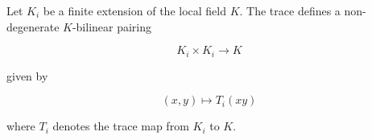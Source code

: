 Let $K_i$ be a finite extension of the local field $K$. The trace defines a non-degenerate $K$-bilinear pairing

$$
K_i \times K_i \longrightarrow K
$$

given by

$$
(x, y) \longmapsto T_i(xy)
$$

where $T_i$ denotes the trace map from $K_i$ to $K$.
